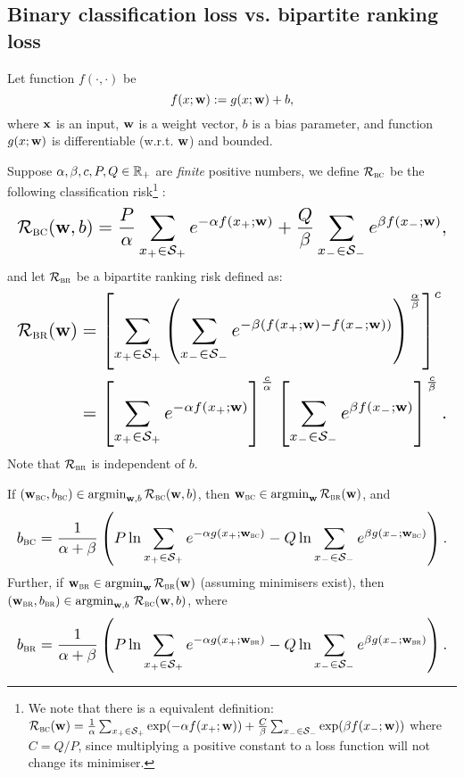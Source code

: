 \subsection{Binary classification loss vs. bipartite ranking loss}

Let function $f(\cdot, \cdot)$ be
$$
f(x; \mathbf{w}) := g(x; \mathbf{w}) + b,
$$
where $\mathbf{x}$ is an input, $\mathbf{w}$ is a weight vector, $b$ is a bias parameter, 
and function $g(x; \mathbf{w})$ is differentiable (w.r.t. $\mathbf{w}$) and bounded.

Suppose $\alpha, \beta, c, P, Q \in \mathbb{R}_+$ are \emph{finite} positive numbers, we define 
$\mathcal{R}_\textsc{bc}$ be the following classification risk\footnote{
We note that there is a equivalent definition:
$\mathcal{R}_\textsc{bc}(\mathbf{w}) = \frac{1}{\alpha} \sum_{x_+ \in \mathcal{S}_+} \exp(-\alpha f(x_+; \mathbf{w})) + 
\frac{C}{\beta} \sum_{x_- \in \mathcal{S}_-} \exp( \beta f(x_-; \mathbf{w}))$
where $C = Q/P$, since multiplying a positive constant to a loss function will not change its minimiser.}
:
\begin{equation*}
\resizebox{\linewidth}{!}{$
\RCal_\textsc{bc}(\w, b)
= \displaystyle 
  \frac{P}{\alpha} \sum_{x_+ \in \SCal_+} e^{-\alpha f(x_+; \w)} +
  \frac{Q}{\beta}  \sum_{x_- \in \SCal_-} e^{ \beta  f(x_-; \w)},
$}
\end{equation*}
and let
$\mathcal{R}_\textsc{br}$ be a bipartite ranking risk defined as:
\begin{equation*}
\resizebox{\linewidth}{!}{$
\begin{aligned}
\RCal_\textsc{br}(\w)
&= \left[ \displaystyle 
   \sum_{x_+ \in \SCal_+} \left( \sum_{x_- \in \SCal_-} e^{-\beta (f(x_+; \w) - f(x_-; \w))} \right)^\frac{\alpha}{\beta} 
   \right]^c \\
&= \left[ \sum_{x_+ \in \SCal_+} e^{-\alpha f(x_+; \w)} \right]^\frac{c}{\alpha}
   \left[ \sum_{x_- \in \SCal_-} e^{ \beta  f(x_-; \w)} \right]^\frac{c}{\beta}.
\end{aligned}
$}
\end{equation*}
Note that $\mathcal{R}_\textsc{br}$ is independent of $b$.


\begin{theorem}
\label{th:bc=br}
If $(\mathbf{w}_\textsc{bc}, b_\textsc{bc}) \in \operatorname*{argmin}_{\mathbf{w},b} \mathcal{R}_\textsc{bc}(\mathbf{w}, b)$,
then $\mathbf{w}_\textsc{bc} \in \operatorname*{argmin}_{\mathbf{w}} \mathcal{R}_\textsc{br}(\mathbf{w})$, and
$$
\resizebox{\linewidth}{!}{$
\displaystyle
b_\textsc{bc} 
= \frac{1}{\alpha + \beta} \left( 
  P \ln \sum_{x_+ \in \SCal_+} e^{-\alpha g(x_+; \w_\textsc{bc})} -
  Q \ln \sum_{x_- \in \SCal_-} e^{  \beta g(x_-; \w_\textsc{bc})} \right).
$}
$$
Further, if $\mathbf{w}_\textsc{br} \in \operatorname*{argmin}_{\mathbf{w}} \mathcal{R}_\textsc{br}(\mathbf{w})$ (assuming minimisers exist),
then $(\mathbf{w}_\textsc{br}, b_\textsc{br}) \in \operatorname*{argmin}_{\mathbf{w},b} \, \mathcal{R}_\textsc{bc}(\mathbf{w}, b)$, where
$$
\resizebox{\linewidth}{!}{$
\displaystyle
b_\textsc{br} 
= \frac{1}{\alpha + \beta} \left( 
  P \ln \sum_{x_+ \in \SCal_+} e^{-\alpha g(x_+; \w_\textsc{br})} -
  Q \ln \sum_{x_- \in \SCal_-} e^{  \beta g(x_-; \w_\textsc{br})} \right).
$}
$$
\end{theorem}

